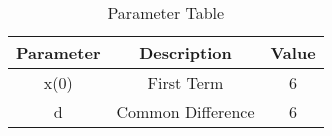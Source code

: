 
\begin{table}[ht]
  \centering
  \begin{tabular}{|c||c||c|}
    \hline
    Parameter & Description & Value \\
    \hline
     x(0) & First Term & 6\\
     \hline
     d & Common Difference & 6\\
    \hline
  \end{tabular}
  \vspace{2mm}
  \caption{Parameter Table}
\end{table}
